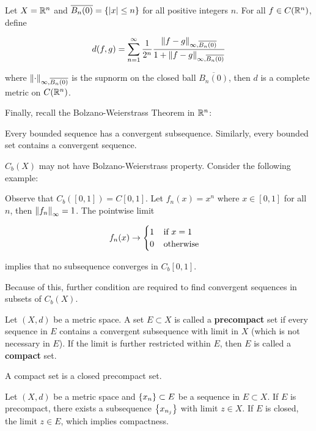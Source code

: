 \documentclass[a4paper,12pt]{article}
\begin{document}
\begin{exm}
  Let $X=\mathbb{R}^{n}$ and $\overline{B_{n}(0)}=\left\{ \left| x\right|\leq n\right\}$ for all positive integers $n$. For all $f\in C(\mathbb{R}^{n})$, define

  $$d(f,g)=\sum_{n=1}^{\infty}\frac{1}{2^{n}}\frac{\left\| f-g\right\|_{\infty,\overline{B_{n}(0)}}}{1+\left\| f-g\right\|_{\infty,\overline{B_{n}(0)}}}$$\s

  where $\left\| \cdot\right\|_{\infty,\overline{B_{n}(0)}}$ is the supnorm on the closed ball $\overline{B_{n}(0)}$, then $d$ is a complete metric on $C(\mathbb{R}^{n})$.
\end{exm}\n

Finally, recall the Bolzano-Weierstrass Theorem in $\mathbb{R}^{n}$:\n

\begin{thm}
  Every bounded sequence has a convergent subsequence. Similarly, every bounded set contains a convergent sequence.
\end{thm}

$C_{b}(X)$ may not have Bolzano-Weierstrass property. Consider the following example:\n

\begin{exm}
  Observe that $C_{b}([0,1])=C[0,1]$. Let $f_{n}(x)=x^{n}$ where $x\in[0,1]$ for all $n$, then $\left\| f_{n}\right\|_{\infty}=1$. The pointwise limit

  $$f_{n}(x)\to\begin{cases}
    1\;\;\;\;\text{if }x=1\\
    0\;\;\;\;\text{otherwise}
  \end{cases}$$\s

  implies that no subsequence converges in $C_{b}[0,1]$.
\end{exm}\n

Because of this, further condition are required to find convergent sequences in subsets of $C_{b}(X)$.\n

\begin{dft}
  Let $(X,d)$ be a metric space. A set $E\subset X$ is called a \textbf{precompact} set if every sequence in $E$ contains a convergent subsequence with limit in $X$ (which is not necessary in $E$). If the limit is further restricted within $E$, then $E$ is called a \textbf{compact} set.
\end{dft}\n

\begin{pst}
  A compact set is a closed precompact set.\n
  
  \prf Let $(X,d)$ be a metric space and $\left\{ x_{n}\right\}\subset E$ be a sequence in $E\subset X$. If $E$ is precompact, there exists a subsequence $\left\{ x_{n_{j}}\right\}$ with limit $z\in X$. If $E$ is closed, the limit $z\in E$, which implies compactness.
\end{pst}\n
\end{document}
